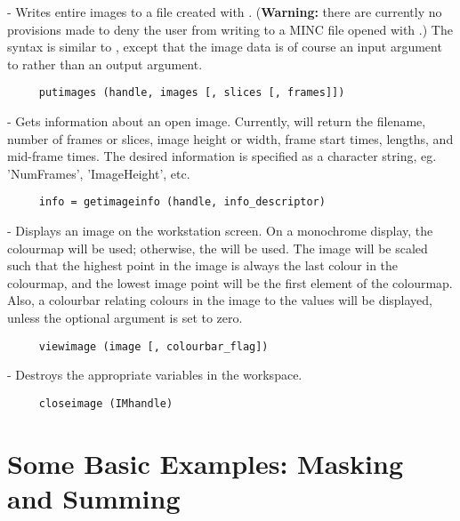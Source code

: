 \begin{description}
\item {} - Writes entire images to a file created with
.  ({\bf Warning:} there are currently no provisions
made to deny the user from writing to a MINC file opened with
.)  The syntax is similar to , except
that the image data is of course an input argument to 
rather than an output argument.
\begin{verbatim}
     putimages (handle, images [, slices [, frames]])
\end{verbatim}

\item {} - Gets information about an open image.
Currently,  will return the filename, number of
frames or slices, image height or width, frame start times, lengths,
and mid-frame times.  The desired information is specified as a
character string, eg. 'NumFrames', 'ImageHeight', etc.
\begin{verbatim}
     info = getimageinfo (handle, info_descriptor)
\end{verbatim}

\item {} - Displays an image on the workstation screen.
On a monochrome display, the  colourmap will be used;
otherwise, the  will be used.  The image will be scaled
such that the highest point in the image is always the last colour in
the colourmap, and the lowest image point will be the first element of
the colourmap.  Also, a colourbar relating colours in the image to the
values will be displayed, unless the optional 
argument is set to zero.

\begin{verbatim}
     viewimage (image [, colourbar_flag])
\end{verbatim}

\item {} - Destroys the appropriate variables in the workspace.
\begin{verbatim}
     closeimage (IMhandle)
\end{verbatim}

\end{description}

\section{Some Basic Examples: Masking and Summing}
\label{simple_example}

